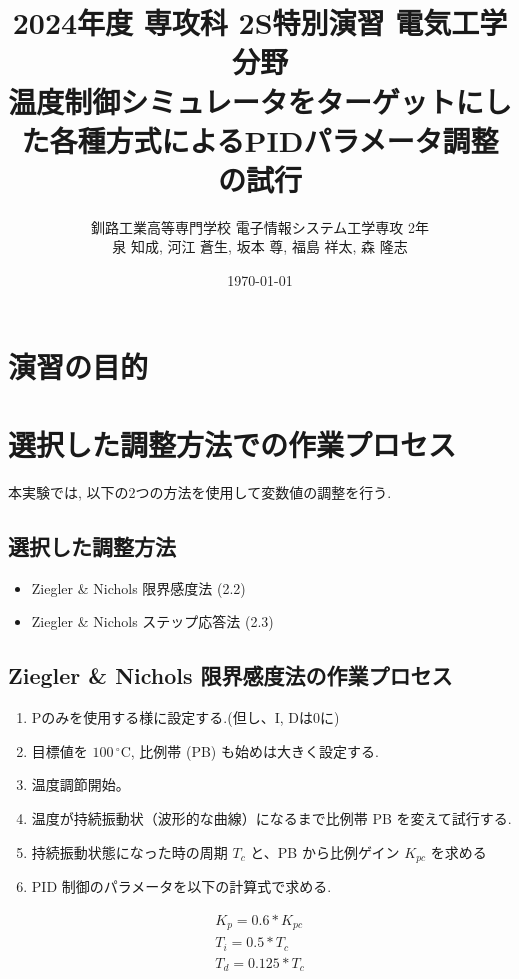 \documentclass[a4j, titlepage]{jarticle}
\title{2024年度 専攻科 2S特別演習 電気工学分野\\温度制御シミュレータをターゲットにした各種方式によるPIDパラメータ調整の試行}
\author{釧路工業高等専門学校 電子情報システム工学専攻 2年\\泉 知成, 河江 蒼生, 坂本 尊, 福島 祥太, 森 隆志}
\date{\today}
\begin{document}
\maketitle
\tableofcontents
\clearpage
\section{演習の目的}

\clearpage
\section{選択した調整方法での作業プロセス}
本実験では, 以下の$2$つの方法を使用して変数値の調整を行う.

\subsection{選択した調整方法}
\begin{itemize}
    \item Ziegler \& Nichols 限界感度法 (2.2)
    \item Ziegler \& Nichols ステップ応答法 (2.3)
\end{itemize}

\subsection{Ziegler \& Nichols 限界感度法の作業プロセス}
\begin{enumerate}
    \item Pのみを使用する様に設定する.(但し、I, Dは0に)
    \item 目標値を $100\,^{\circ}\mathrm{C}$, 比例帯 (PB) も始めは大きく設定する.
    \item 温度調節開始。
    \item 温度が持続振動状（波形的な曲線）になるまで比例帯 PB を変えて試行する.
    \item 持続振動状態になった時の周期 $T_c$ と、PB から比例ゲイン $K_{pc}$ を求める
    \item PID 制御のパラメータを以下の計算式で求める.
\end{enumerate}
\begin{align*}
    K_p = 0.6 * K_{pc} \\
    T_i = 0.5 * T_{c} \\
    T_d = 0.125 * T_{c}
\end{align*}
\end{document}
